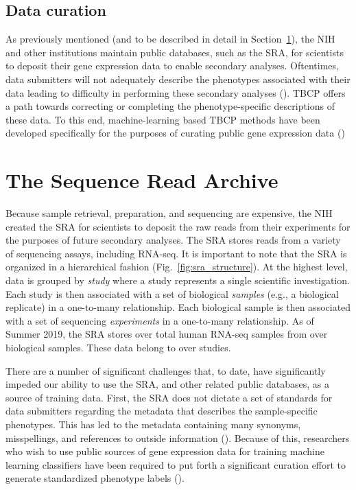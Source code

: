 \subsection{Data curation}

As previously mentioned (and to be described in detail in Section~\ref{sec:intro_sra}), the NIH and other institutions maintain public databases, such as the SRA, for scientists to deposit their gene expression data to enable secondary analyses.  Oftentimes, data submitters will not adequately describe the phenotypes associated with their data leading to difficulty in performing these secondary analyses (\citealp{Goncalves2019, Goncalves2017}).  TBCP offers a path towards correcting or completing the phenotype-specific descriptions of these data. To this end, machine-learning based TBCP methods have been developed specifically for the purposes of curating public gene expression data (\citealp{Ellis, Lee2013})

\section{The Sequence Read Archive}\label{sec:intro_sra}

Because sample retrieval, preparation, and sequencing are expensive, the NIH created the SRA for scientists to deposit the raw reads from their experiments for the purposes of future secondary analyses. The SRA stores reads from a variety of sequencing assays, including RNA-seq.  It is important to note that the SRA is organized in a hierarchical fashion (Fig.~\ref{fig:sra_structure}). At the highest level, data is grouped by \textit{study} where a study represents a single scientific investigation.  Each study is then associated with a set of biological \textit{samples} (e.g., a biological replicate) in a one-to-many relationship. Each biological sample is then associated with a set of sequencing \textit{experiments} in a one-to-many relationship.  As of Summer 2019, the SRA stores over \NumSRAExperiments{} total human RNA-seq samples from over \NumSRASamples{} biological samples. These data belong to over \NumSRAStudies{} studies. 

There are a number of significant challenges that, to date, have significantly impeded our ability to use the SRA, and other related public databases, as a source of training data. First, the SRA does not dictate a set of standards for data submitters regarding the metadata that describes the sample-specific phenotypes.  This has led to the metadata containing many synonyms, misspellings, and references to outside information (\citealp{Goncalves2017}).  Because of this, researchers who wish to use public sources of gene expression data for training machine learning classifiers have been required to put forth a significant curation effort to generate standardized phenotype labels (\citealp{Alavi2018, Lee2013, Schmid2012}).

